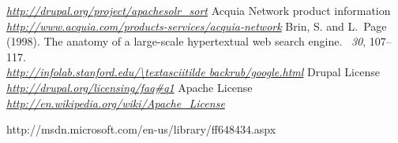 \begin{thebibliography}{99}
		\emph{\url{http://drupal.org/project/apachesolr_sort}}
		Acquia Network product information\\
		\emph{\url{http://www.acquia.com/products-services/acquia-network}}
		Brin, S. and L.~Page (1998).
		\newblock The anatomy of a large-scale hypertextual web search engine.
		~{\em 30}, 107--117.\\
		\emph{\url{http://infolab.stanford.edu/\textasciitilde backrub/google.html}}
		Drupal License\\
		\emph{\url{http://drupal.org/licensing/faq\#q1}}
		Apache License\\
		\emph{\url{http://en.wikipedia.org/wiki/Apache_License}}

http://msdn.microsoft.com/en-us/library/ff648434.aspx
\end{thebibliography}

